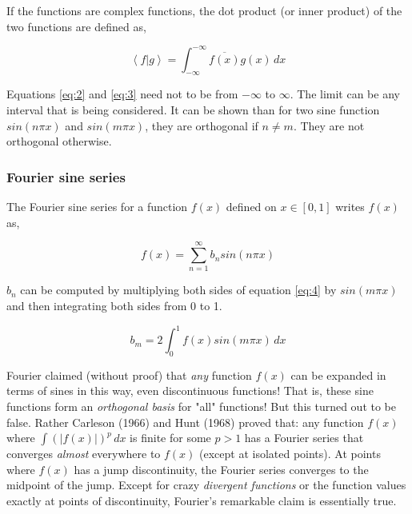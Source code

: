 \documentclass{article}
\theoremstyle{mytheoremstyle}
\theoremstyle{mytheoremstyle}
\theoremstyle{myproblemstyle}
\newcommand{\innerp}[2]{\left\langle #1 \vert #2 \right\rangle}
\begin{document}
    \noindent If the functions are complex functions, the dot product (or inner product)
    of the two functions are defined as,

    \begin{equation}
	\innerp{f}{g} = \int_{-\infty}^{-\infty} \overline{f(x)} g(x) \, dx
    	\label{eq:3}
    \end{equation}

    \noindent Equations \ref{eq:2} and \ref{eq:3} need not to be from $ -\infty $ to $ \infty $.
    The limit can be any interval that is being considered.
    It can be shown than for two sine function $ sin(n \pi x) $ and 
    $ sin(m \pi x) $, they are orthogonal if $ n \neq m $. They are not orthogonal
    otherwise.

    \subsubsection{Fourier sine series}
    \noindent The Fourier sine series for a function $ f(x) $ defined on
    $ x \in [0,1] $ writes $ f(x) $ as,

    \begin{equation}
	    f(x) = \sum_{n=1}^{\infty} b_n sin(n \pi x)
    	\label{eq:4}
    \end{equation}

    \noindent $ b_n $ can be computed by multiplying both sides of equation \ref{eq:4}
    by $ sin(m \pi x) $ and then integrating both sides from 0 to 1.

    \begin{equation}
	b_m = 2 \int_{0}^{1} f(x) sin(m \pi x) \, dx
    	\label{eq:5}
    \end{equation}

    \noindent Fourier claimed (without proof) that \emph{any} function
    $ f(x) $ can be expanded in terms of sines in this way, even
    discontinuous functions! That is, these sine functions form an
    \emph{orthogonal basis} for "all" functions! But this turned out to be
    false. Rather Carleson (1966) and Hunt (1968) proved that: any function
    $ f(x) $ where $ \int (\lvert f(x) \rvert)^p \, dx $ is finite for some
    $ p > 1 $ has a Fourier series that converges \emph{almost} everywhere
    to $ f(x) $ (except at isolated points). At points where $ f(x) $ has
    a jump discontinuity, the Fourier series converges to the midpoint of
    the jump. Except for crazy \emph{divergent functions} or the function
    values exactly at points of discontinuity, Fourier's remarkable claim
    is essentially true.
\end{document}
